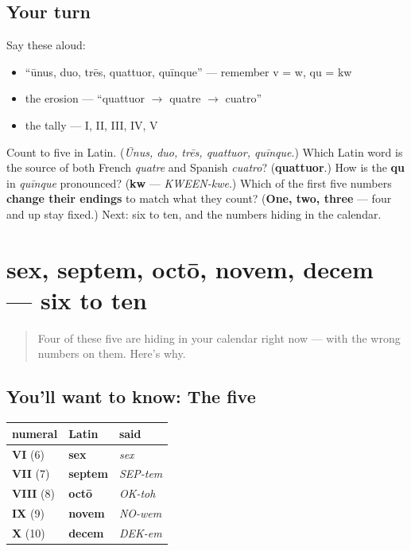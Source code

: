 \subsection*{Your turn}
Say these aloud:

\begin{itemize}
\raggedright
  \item \textquotedblleft{}ūnus, duo, trēs, quattuor, quīnque\textquotedblright{} — remember v = w, qu = kw
  \item the erosion — \textquotedblleft{}quattuor $\to$ quatre $\to$ cuatro\textquotedblright{}
  \item the tally — I, II, III, IV, V
\end{itemize}

\begin{tcolorbox}[breakable,colback=teal!4,colframe=teal!35!black,title={Before you move on}]
Count to five in Latin. (\emph{Ūnus, duo, trēs, quattuor, quīnque}.) Which Latin word is the source of both French \emph{quatre} and Spanish \emph{cuatro}? (\textbf{quattuor}.) How is the \textbf{qu} in \emph{quīnque} pronounced? (\textbf{kw} — \emph{KWEEN-kwe}.) Which of the first five numbers \textbf{change their endings} to match what they count? (\textbf{One, two, three} — four and up stay fixed.) Next: six to ten, and the numbers hiding in the calendar.
\end{tcolorbox}
\section[sex septem octō novem decem]{sex, septem, octō, novem, decem — six to ten}

\label{lesson:LA-C02-numbers-6-10}



\begin{quote}
Four of these five are hiding in your calendar right now — with the wrong numbers on them. Here's why.
\end{quote}

\subsection*{You'll want to know: The five}
\noindent
\begin{tabularx}{\linewidth}{@{}>{\raggedright\arraybackslash}X>{\raggedright\arraybackslash}X>{\raggedright\arraybackslash}X@{}}
\toprule
\textbf{numeral} & \textbf{Latin} & \textbf{said} \\
\midrule
\textbf{VI} (6) & \textbf{sex} & \emph{sex} \\
\textbf{VII} (7) & \textbf{septem} & \emph{SEP-tem} \\
\textbf{VIII} (8) & \textbf{octō} & \emph{OK-toh} \\
\textbf{IX} (9) & \textbf{novem} & \emph{NO-wem} \\
\textbf{X} (10) & \textbf{decem} & \emph{DEK-em} \\
\bottomrule
\end{tabularx}

